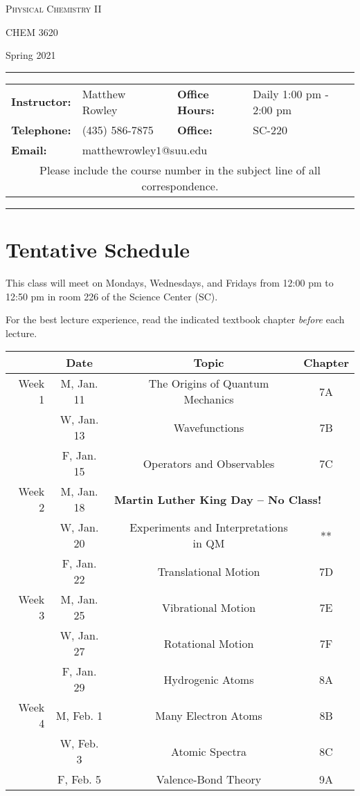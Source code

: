 \documentclass[12pt, letterpaper]{article}
\begin{document}
\begin{center}
	{\Large \textsc{Physical Chemistry II}}
	
	CHEM 3620
\end{center}
\begin{center}
	{\large Spring 2021}
\end{center}
\begin{center}
	\rule{0.85\textwidth}{0.4pt}
	\begin{tabular}{llcll}
		\textbf{Instructor:} & Matthew Rowley & & \textbf{Office Hours:} & Daily 1:00 pm - 2:00 pm \\
		\textbf{Telephone:} & (435) 586-7875 & & \textbf{Office:} & SC-220 \\
		\textbf{Email:} & \multicolumn{3}{l}{matthewrowley$1$@suu.edu}\\
		\multicolumn{5}{c}{Please include the course number in the subject line of all correspondence.} 
	\end{tabular}
	\rule{0.85\textwidth}{0.4pt}
\end{center}

\section*{Tentative Schedule}
This class will meet on Mondays, Wednesdays, and Fridays from 12:00 pm to 12:50 pm in room 226 of the Science Center (SC).

\noindent For the best lecture experience, read the indicated textbook chapter \emph{before} each lecture. 

\noindent
\begin{tabular}{rcccc}
	& Date && Topic & Chapter\\
	\midrule
	Week 1 & M, Jan. 11&& The Origins of Quantum Mechanics & 7A\\
	& W, Jan. 13&& Wavefunctions & 7B\\
	& F, Jan. 15&& Operators and Observables & 7C\\
	\midrule
	Week 2 & M, Jan. 18& \multicolumn{3}{l}{\textbf{Martin Luther King Day -- No Class!}}\\
	& W, Jan. 20&& Experiments and Interpretations in QM & **\\
	& F, Jan. 22&& Translational Motion & 7D\\
	\midrule
	Week 3 & M, Jan. 25&& Vibrational Motion & 7E\\
	& W, Jan. 27&& Rotational Motion & 7F\\
	& F, Jan. 29&& Hydrogenic Atoms & 8A\\
	\midrule
	Week 4 & M, Feb. 1&& Many Electron Atoms & 8B\\
	& W, Feb. 3&& Atomic Spectra & 8C\\
	& F, Feb. 5&& Valence-Bond Theory & 9A\\
\end{tabular}
\end{document}
